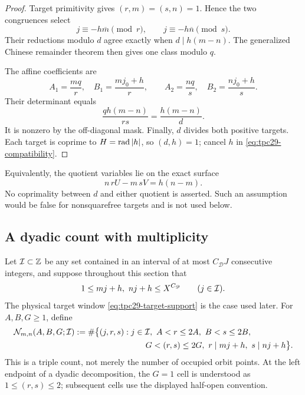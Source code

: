 \begin{proof}
Target primitivity gives $(r,m)=(s,n)=1$.  Hence the two congruences
select
\[
 j\equiv-h\overline m\pmod r,
 \qquad
 j\equiv-h\overline n\pmod s.
\]
Their reductions modulo $d$ agree exactly when
$d\mid h(m-n)$.  The generalized Chinese remainder theorem then gives
one class modulo $q$.

The affine coefficients are
\[
 A_1=\frac{mq}{r},\quad B_1=\frac{mj_0+h}{r},
 \qquad
 A_2=\frac{nq}{s},\quad B_2=\frac{nj_0+h}{s}.
\]
Their determinant equals
\[
 \frac{qh(m-n)}{rs}=\frac{h(m-n)}d.
\]
It is nonzero by the off-diagonal mask.  Finally, $d$ divides both
positive targets.  Each target is coprime to $H=\operatorname{rad}|h|$, so
$(d,h)=1$; cancel $h$ in \eqref{eq:tpc29-compatibility}.
\end{proof}

Equivalently, the quotient variables lie on the exact surface
\begin{equation}
 n\,rU-m\,sV=h(n-m).
 \label{eq:tpc29-reflected-surface}
\end{equation}
No coprimality between $d$ and either quotient is asserted.  Such an
assumption would be false for nonsquarefree targets and is not used
below.

\subsection{A dyadic count with multiplicity}

Let $\mathcal I\subset\mathbb Z$ be any set contained in an interval of at most
$C_{\mathscr D}J$ consecutive integers, and suppose throughout this
section that
\begin{equation}
 1\le mj+h,\ nj+h\le X^{C_{\mathscr D}}
 \qquad(j\in\mathcal I).
 \label{eq:tpc29-polynomial-target-window}
\end{equation}
The physical target window \eqref{eq:tpc29-target-support} is the case
used later.  For $A,B,G\ge1$, define
\begin{align}
 \mathcal N_{m,n}(A,B,G;\mathcal I)
 :={}&\#\bigl\{(j,r,s):j\in\mathcal I,\ A<r\le2A,\ B<s\le2B,
 \notag\\
 &\hspace{7em}G<(r,s)\le2G,
 \ r\mid mj+h,\ s\mid nj+h\bigr\}.
 \label{eq:tpc29-incidence-count}
\end{align}
This is a triple count, not merely the number of occupied orbit
points.  At the left endpoint of a dyadic decomposition, the $G=1$
cell is understood as $1\le(r,s)\le2$; subsequent cells use the
displayed half-open convention.

